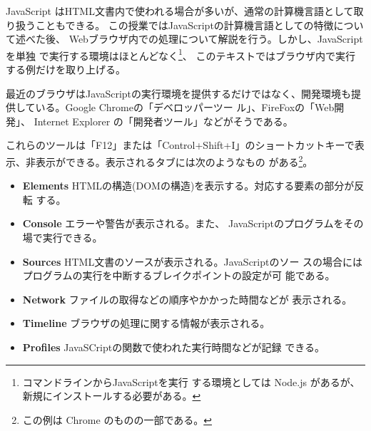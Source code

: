 JavaScript はHTML文書内で使われる場合が多いが、通常の計算機言語として取
り扱うこともできる。
この授業ではJavaScriptの計算機言語としての特徴について述べた後、
Webブラウザ内での処理について解説を行う。しかし、JavaScriptを単独
で実行する環境はほとんどなく\footnote{コマンドラインからJavaScriptを実行
する環境としては Node.js があるが、新規にインストールする必要がある。}、
このテキストではブラウザ内で実行する例だけを取り上げる。

最近のブラウザはJavaScriptの実行環境を提供するだけではなく、開発環境も提
供している。Google Chromeの「デベロッパーツー
ル」、FireFoxの「Web開発」、%
Internet Explorer の「開発者ツール」などがそうである。

これらのツールは「F12」または「Control+Shift+I」のショートカットキーで表
示、非表示ができる。表示されるタブには次のようなもの
がある\footnote{この例は Chrome のものの一部である。}。
\begin{itemize}
 \item {\bfseries Elements }
       HTMLの構造(DOMの構造)を表示する。対応する要素の部分が反転
       する。
 \item {\bfseries Console }エラーや警告が表示される。また、
       JavaScriptのプログラムをその場で実行できる。
 \item {\bfseries Sources }HTML文書のソースが表示される。JavaScriptのソー
       スの場合にはプログラムの実行を中断するブレイクポイントの設定が可
       能である。
 \item {\bfseries Network }ファイルの取得などの順序やかかった時間などが
       表示される。
 \item {\bfseries Timeline }ブラウザの処理に関する情報が表示される。
 \item {\bfseries Profiles }JavaSCriptの関数で使われた実行時間などが記録
       できる。
\end{itemize}